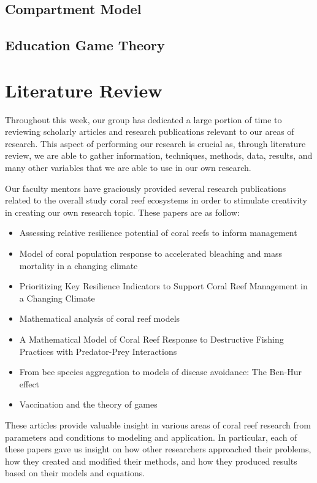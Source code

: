 \documentclass[12pt]{article}
\begin{document}
\subsection{Compartment Model}
\subsection{Education Game Theory}

\section{Literature Review}
Throughout this week, our group has dedicated a large portion of time to reviewing scholarly articles and research publications relevant to our areas of research. This aspect of performing our research is crucial as, through literature review, we are able to gather information, techniques, methods, data, results, and many other variables that we are able to use in our own research. \par
Our faculty mentors have graciously provided several research publications related to the overall study coral reef ecosystems in order to stimulate creativity in creating our own research topic. These papers are as follow:
\begin{itemize}
    \item Assessing relative resilience potential of coral reefs to inform management\cite{assesing_relative}
    \item Model of coral population response to accelerated bleaching and mass mortality in a changing climate\cite{Riegl_Purkis_Model}
    \item Prioritizing Key Resilience Indicators to Support Coral Reef Management in a Changing Climate\cite{prioritize}
    \item Mathematical analysis of coral reef models\cite{mathanalysis}
    \item A Mathematical Model of Coral Reef Response to Destructive Fishing Practices with Predator-Prey Interactions\cite{quintero_machuca_cotto_bradley_ríos-soto_2016}
    \item From bee species aggregation to models of disease avoidance: The Ben-Hur effect\cite{yong_herrera_castillo-chavez_2016}
    \item Vaccination and the theory of games\cite{bauch_earn_2004}
\end{itemize}
These articles provide valuable insight in various areas of coral reef research from parameters and conditions to modeling and application. In particular, each of these papers gave us insight on how other researchers approached their problems, how they created and modified their methods, and how they produced results based on their models and equations. 
\end{document}
